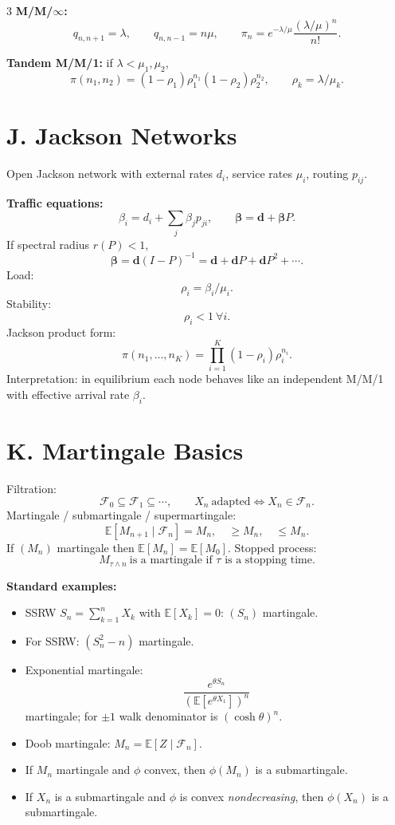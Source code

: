 \documentclass[8pt]{extarticle}
\newcommand{\E}{\mathbb{E}}
\newcommand{\1}{\mathbf{1}}
\newcommand{\cF}{\mathcal{F}}
\begin{document}
\begin{multicols*}{3}
\textbf{M/M/$\infty$:}
\[
q_{n,n+1}=\lambda,\qquad q_{n,n-1}=n\mu,\qquad
\pi_n=e^{-\lambda/\mu}\frac{(\lambda/\mu)^n}{n!}.
\]

\textbf{Tandem M/M/1:} if $\lambda<\mu_1,\mu_2$,
\[
\pi(n_1,n_2)=(1-\rho_1)\rho_1^{n_1}(1-\rho_2)\rho_2^{n_2},\qquad
\rho_k=\lambda/\mu_k.
\]

\section*{J. Jackson Networks}
Open Jackson network with external rates $d_i$, service rates $\mu_i$, routing $p_{ij}$.

\textbf{Traffic equations:}
\[
\beta_i=d_i+\sum_j \beta_j p_{ji},\qquad
\boldsymbol{\beta}=\mathbf d+\boldsymbol{\beta}P.
\]
If spectral radius $r(P)<1$,
\[
\boldsymbol{\beta}=\mathbf d(I-P)^{-1}
=\mathbf d+\mathbf dP+\mathbf dP^2+\cdots.
\]
Load:
\[
\rho_i=\beta_i/\mu_i.
\]
Stability:
\[
\rho_i<1\ \forall i.
\]
Jackson product form:
\[
\pi(n_1,\dots,n_K)=\prod_{i=1}^K (1-\rho_i)\rho_i^{n_i}.
\]
Interpretation: in equilibrium each node behaves like an independent M/M/1 with effective arrival rate $\beta_i$.

\section*{K. Martingale Basics}
Filtration:
\[
\cF_0\subseteq \cF_1\subseteq \cdots,\qquad
X_n\ \text{adapted} \iff X_n\in\cF_n.
\]
Martingale / submartingale / supermartingale:
\[
\E[M_{n+1}\mid \cF_n]=M_n,\quad
\ge M_n,\quad
\le M_n.
\]
If $(M_n)$ martingale then $\E[M_n]=\E[M_0]$.
Stopped process:
\[
M_{\tau\wedge n}\ \text{is a martingale if }\tau\text{ is a stopping time}.
\]

\textbf{Standard examples:}
\begin{itemize}
\item SSRW $S_n=\sum_{k=1}^n X_k$ with $\E[X_k]=0$: $(S_n)$ martingale.
\item For SSRW: $(S_n^2-n)$ martingale.
\item Exponential martingale:
\[
\frac{e^{\theta S_n}}{(\E[e^{\theta X_1}])^n}
\]
martingale; for $\pm1$ walk denominator is $(\cosh\theta)^n$.
\item Doob martingale: $M_n=\E[Z\mid \cF_n]$.
\item If $M_n$ martingale and $\phi$ convex, then $\phi(M_n)$ is a submartingale.
\item If $X_n$ is a submartingale and $\phi$ is convex \emph{nondecreasing}, then $\phi(X_n)$ is a submartingale.
\end{itemize}


\end{multicols*}
\end{document}
